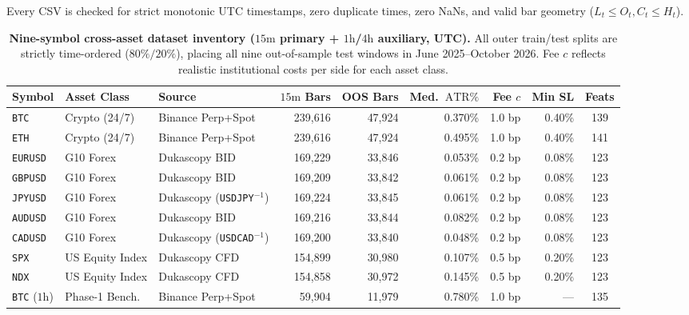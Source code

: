\documentclass{article}
\newcommand{\ATR}{\mathrm{ATR}}
\begin{document}
Every CSV is checked for strict monotonic UTC timestamps, zero duplicate times, zero NaNs, and valid bar geometry ($L_t \le O_t, C_t \le H_t$).

\begin{table}[t]
  \centering
  \caption{\textbf{Nine-symbol cross-asset dataset inventory ($15\text{m}$ primary + $1\text{h}$/$4\text{h}$ auxiliary, UTC).} All outer train/test splits are strictly time-ordered ($80\%/20\%$), placing all nine out-of-sample test windows in June 2025--October 2026. Fee $c$ reflects realistic institutional costs per side for each asset class.}
  \label{tab:datasets}
  \scriptsize
  \setlength{\tabcolsep}{3.1pt}
  \begin{tabular}{@{}lllrrrrrc@{}}
    \toprule
    Symbol & Asset Class & Source & $15\text{m}$ Bars & OOS Bars & Med.\ $\ATR\%$ & Fee $c$ & Min SL & Feats \\
    \midrule
    \texttt{BTC} & Crypto (24/7) & Binance Perp+Spot & 239,616 & 47,924 & 0.370\% & 1.0 bp & 0.40\% & 139 \\
    \texttt{ETH} & Crypto (24/7) & Binance Perp+Spot & 239,616 & 47,924 & 0.495\% & 1.0 bp & 0.40\% & 141 \\
    \midrule
    \texttt{EURUSD} & G10 Forex & Dukascopy BID & 169,229 & 33,846 & 0.053\% & 0.2 bp & 0.08\% & 123 \\
    \texttt{GBPUSD} & G10 Forex & Dukascopy BID & 169,209 & 33,842 & 0.061\% & 0.2 bp & 0.08\% & 123 \\
    \texttt{JPYUSD} & G10 Forex & Dukascopy (\texttt{USDJPY}$^{-1}$) & 169,224 & 33,845 & 0.061\% & 0.2 bp & 0.08\% & 123 \\
    \texttt{AUDUSD} & G10 Forex & Dukascopy BID & 169,216 & 33,844 & 0.082\% & 0.2 bp & 0.08\% & 123 \\
    \texttt{CADUSD} & G10 Forex & Dukascopy (\texttt{USDCAD}$^{-1}$) & 169,200 & 33,840 & 0.048\% & 0.2 bp & 0.08\% & 123 \\
    \midrule
    \texttt{SPX} & US Equity Index & Dukascopy CFD & 154,899 & 30,980 & 0.107\% & 0.5 bp & 0.20\% & 123 \\
    \texttt{NDX} & US Equity Index & Dukascopy CFD & 154,858 & 30,972 & 0.145\% & 0.5 bp & 0.20\% & 123 \\
    \midrule
    \texttt{BTC} ($1\text{h}$) & Phase-1 Bench. & Binance Perp+Spot & 59,904 & 11,979 & 0.780\% & 1.0 bp & --- & 135 \\
    \bottomrule
  \end{tabular}
\end{table}
\end{document}
